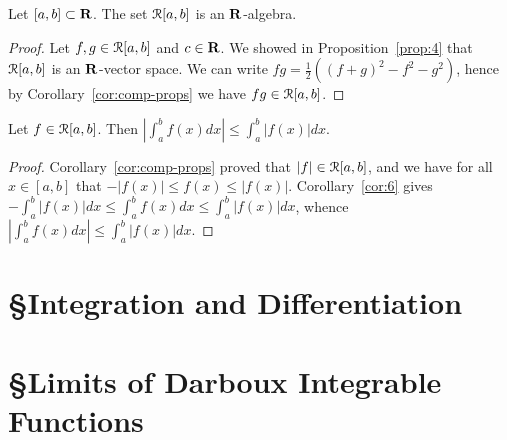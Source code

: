 \documentclass[11pt,twoside,openany]{memoir}
\begin{document}
    \begin{corollary}
        Let $[a,b] \subset \mathbf{R}$. The set $\mathcal{R}[a,b]$ is an $\mathbf{R}$-algebra.
    \end{corollary}
        \begin{proof}
            Let $f,g \in \mathcal{R}[a,b]$ and $c \in \mathbf{R}$. We showed in Proposition~\ref{prop:4} that $\mathcal{R}[a,b]$ is an $\mathbf{R}$-vector space. We can write $fg = \frac{1}{2}((f+g)^2 - f^2 - g^2)$, hence by Corollary~\ref{cor:comp-props} we have $fg \in \mathcal{R}[a,b]$.
        \end{proof}

    \begin{corollary}
        Let $f \in \mathcal{R}[a,b]$. Then $\left| \int_a^b f(x)dx \right| \leq \int_a^b |f(x)|dx$.
    \end{corollary}
        \begin{proof}
            Corollary~\ref{cor:comp-props} proved that $|f| \in \mathcal{R}[a,b]$, and we have for all $x \in [a,b]$ that $-|f(x)| \leq f(x) \leq |f(x)|$. Corollary~\ref{cor:6} gives $-\int_a^b |f(x)|dx \leq \int_a^b f(x)dx \leq \int_a^b|f(x)|dx$, whence $\left| \int_a^b f(x)dx \right| \leq \int_a^b |f(x)|dx$.
        \end{proof}

\section*{\S\:\:Integration and Differentiation}

\section*{\S\:\:Limits of Darboux Integrable Functions}
    \begin{example}
        
    \end{example}
\end{document}
